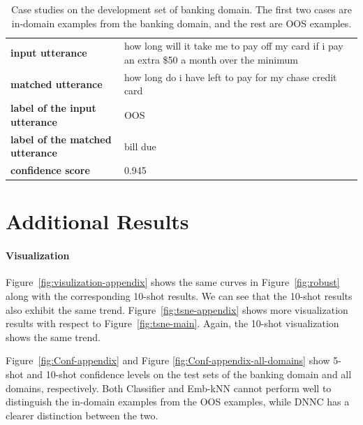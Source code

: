 \begin{table}[]
{\begin{tabular}{ll}
\textbf{input utterance}    & how long will it take me to pay off my card if i pay an extra \$50 a month over the minimum \\
\textbf{matched utterance} & how long do i have left to pay for my chase credit card                                     \\
\textbf{label of the input utterance}      & OOS                                                                                         \\
\textbf{label of the matched utterance}      & bill due                                                                                   \\
\textbf{confidence score}             & 0.945                                                                                      \\ \hline
\end{tabular}} \caption{Case studies on the development set of banking domain. The first two cases are in-domain examples from the banking domain, and the rest are OOS examples.}\label{table:case-study}
\end{table}


\section{Additional Results}
\label{extra-results}

\paragraph{Visualization} \label{appendix-vidualization}
Figure~\ref{fig:visulization-appendix} shows the same curves in Figure~\ref{fig:robust} along with the corresponding 10-shot results.
We can see that the 10-shot results also exhibit the same trend.
Figure~\ref{fig:tsne-appendix} shows more visualization results with respect to Figure~\ref{fig:tsne-main}.
Again, the 10-shot visualization shows the same trend.

Figure~\ref{fig:Conf-appendix} and Figure \ref{fig:Conf-appendix-all-domains} show 5-shot and 10-shot confidence levels on the test sets of the banking domain and all domains, respectively.
Both Classifier and Emb-kNN cannot perform well to distinguish the in-domain examples from the OOS examples, while DNNC has a clearer distinction between the two.

